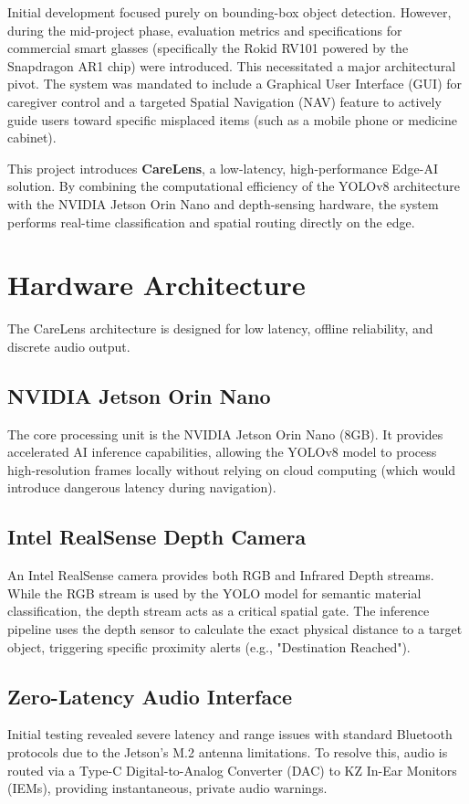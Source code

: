 \documentclass[12pt,onecolumn]{IEEEtran}
\begin{document}
Initial development focused purely on bounding-box object detection. However, during the mid-project phase, evaluation metrics and specifications for commercial smart glasses (specifically the Rokid RV101 powered by the Snapdragon AR1 chip) were introduced. This necessitated a major architectural pivot. The system was mandated to include a Graphical User Interface (GUI) for caregiver control and a targeted Spatial Navigation (NAV) feature to actively guide users toward specific misplaced items (such as a mobile phone or medicine cabinet).

This project introduces \textbf{CareLens}, a low-latency, high-performance Edge-AI solution. By combining the computational efficiency of the YOLOv8 architecture with the NVIDIA Jetson Orin Nano and depth-sensing hardware, the system performs real-time classification and spatial routing directly on the edge.

\section{Hardware Architecture}
The CareLens architecture is designed for low latency, offline reliability, and discrete audio output.

\subsection{NVIDIA Jetson Orin Nano}
The core processing unit is the NVIDIA Jetson Orin Nano (8GB). It provides accelerated AI inference capabilities, allowing the YOLOv8 model to process high-resolution frames locally without relying on cloud computing (which would introduce dangerous latency during navigation).

\subsection{Intel RealSense Depth Camera}
An Intel RealSense camera provides both RGB and Infrared Depth streams. While the RGB stream is used by the YOLO model for semantic material classification, the depth stream acts as a critical spatial gate. The inference pipeline uses the depth sensor to calculate the exact physical distance to a target object, triggering specific proximity alerts (e.g., "Destination Reached").

\subsection{Zero-Latency Audio Interface}
Initial testing revealed severe latency and range issues with standard Bluetooth protocols due to the Jetson's M.2 antenna limitations. To resolve this, audio is routed via a Type-C Digital-to-Analog Converter (DAC) to KZ In-Ear Monitors (IEMs), providing instantaneous, private audio warnings.
\end{document}
